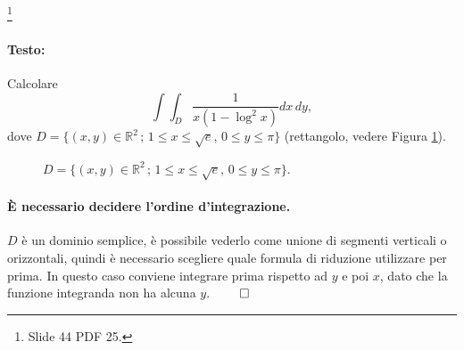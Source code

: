 \begin{example}\footnote{Slide 44 PDF 25.}
	\paragraph{Testo:} Calcolare
	\begin{equation}\label{eq:integrale_doppio_esempio_rettangolo}
		\int\int_D \frac{1}{x(1-\log^2x)} dx\,dy,
	\end{equation}
	dove $D=\{(x,y)\in\mathbb{R}^2\,;\, 1\leq x\leq\sqrt{e},\, 0\leq y\leq \pi\}$ (rettangolo, vedere Figura \ref{fig:dominio_rettangolo_integrale}).
	
	\begin{figure}
		\centering
		\caption{$D=\{(x,y)\in\mathbb{R}^2\,;\, 1\leq x\leq\sqrt{e},\, 0\leq y\leq \pi\}$.}
		\label{fig:dominio_rettangolo_integrale}
	\end{figure}
	
	\paragraph{È necessario decidere l'ordine d'integrazione.} $D$ è un dominio semplice, è possibile vederlo come unione di segmenti verticali o orizzontali, quindi è necessario scegliere quale formula di riduzione utilizzare per prima. In questo caso conviene integrare prima rispetto ad $y$ e poi $x$, dato che la funzione integranda non ha alcuna $y$. $\qed$
	

\end{example}
